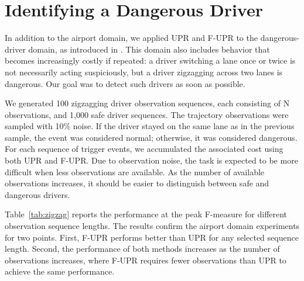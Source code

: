 {\section{Identifying a Dangerous Driver}
\noindent
In addition to the airport domain, we applied UPR and F-UPR to the dangerous-driver domain, as introduced in \cite{Avrahami-Zilberbrand2009}. This domain also includes behavior that becomes increasingly costly if repeated: a driver switching a lane once or twice is not necessarily acting suspiciously, but a driver zigzagging across two lanes is dangerous. Our goal was to detect such drivers as soon as possible. 


We generated 100 zigzagging driver observation sequences, each consisting of N observations, and 1,000 safe driver sequences. The trajectory observations were sampled with 10\% noise. If the driver stayed on the same lane as in the previous sample, the event was considered normal; otherwise, it was considered dangerous. For each sequence of trigger events, we accumulated the associated cost using both UPR and F-UPR. 
Due to observation noise, the task is expected to be more difficult when less observations are available. As the number of available observations increases, it should be easier to distinguish between safe and dangerous drivers.


Table~\ref{tab:zigzag} reports the performance at the peak F-measure for different observation sequence lengths. The results confirm the airport domain experiments for two points. First, F-UPR performs better than UPR for any selected sequence length. Second, the performance of both methods increases as the number of observations increases, where F-UPR requires fewer observations than UPR to achieve the same performance. 


}
